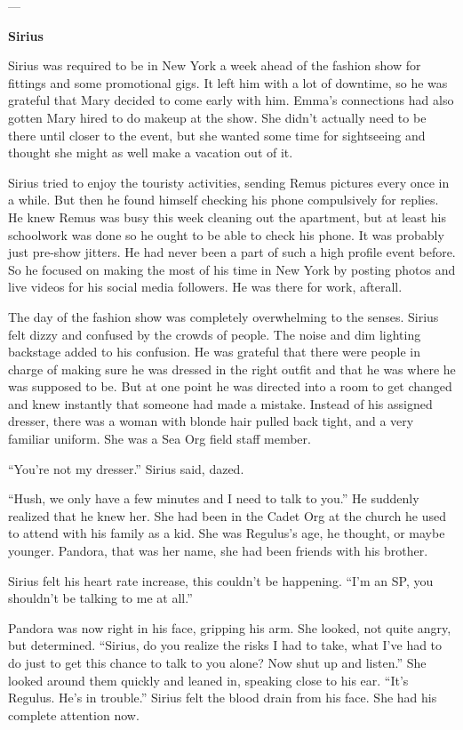 \documentclass[12pt,twoside,openright]{memoir}
\begin{document}
---

\textbf{Sirius} 

Sirius was required to be in New York a week ahead of the fashion show for fittings and some promotional gigs. It left him with a lot of downtime, so he was grateful that Mary decided to come early with him. Emma's connections had also gotten Mary hired to do makeup at the show. She didn't actually need to be there until closer to the event, but she wanted some time for sightseeing and thought she might as well make a vacation out of it. 

Sirius tried to enjoy the touristy activities, sending Remus pictures every once in a while. But then he found himself checking his phone compulsively for replies. He knew Remus was busy this week cleaning out the apartment, but at least his schoolwork was done so he ought to be able to check his phone. It was probably just pre-show jitters. He had never been a part of such a high profile event before. So he focused on making the most of his time in New York by posting photos and live videos for his social media followers. He was there for work, afterall.

The day of the fashion show was completely overwhelming to the senses. Sirius felt dizzy and confused by the crowds of people. The noise and dim lighting backstage added to his confusion. He was grateful that there were people in charge of making sure he was dressed in the right outfit and that he was where he was supposed to be. But at one point he was directed into a room to get changed and knew instantly that someone had made a mistake. Instead of his assigned dresser, there was a woman with blonde hair pulled back tight, and a very familiar uniform. She was a Sea Org field staff member. 

``You're not my dresser.'' Sirius said, dazed. 

``Hush, we only have a few minutes and I need to talk to you.'' He suddenly realized that he knew her. She had been in the Cadet Org at the church he used to attend with his family as a kid. She was Regulus's age, he thought, or maybe younger. Pandora, that was her name, she had been friends with his brother.

Sirius felt his heart rate increase, this couldn't be happening. ``I'm an SP, you shouldn't be talking to me at all.''

Pandora was now right in his face, gripping his arm. She looked, not quite angry, but determined. ``Sirius, do you realize the risks I had to take, what I've had to do just to get this chance to talk to you alone? Now shut up and listen.'' She looked around them quickly and leaned in, speaking close to his ear. ``It's Regulus. He's in trouble.''
Sirius felt the blood drain from his face. She had his complete attention now.
\end{document}
